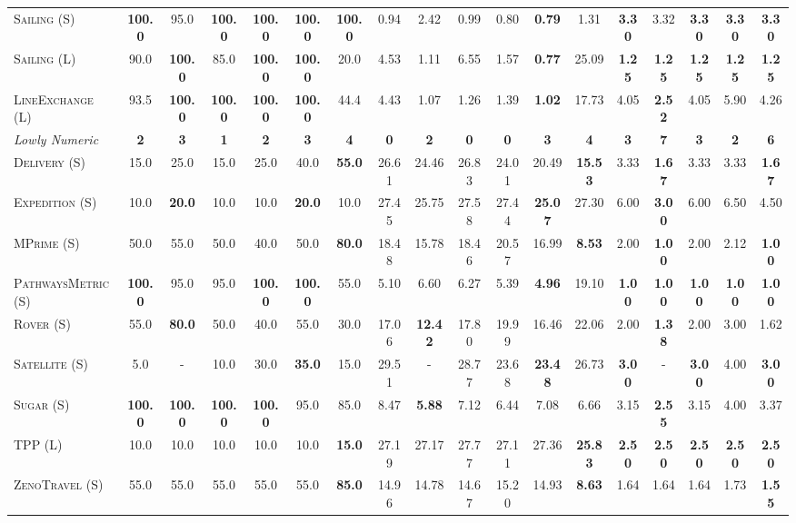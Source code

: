 \documentclass[11pt,landscape]{article}
\begin{document}
\begin{table*}[tb]
{\begin{tabular}{|l||cccccc||cccccc||ccccc||}
\textsc{Sailing} (S)&\textbf{100.0}&95.0&\textbf{100.0}&\textbf{100.0}&\textbf{100.0}&\textbf{100.0}&0.94&2.42&0.99&0.80&\textbf{0.79}&1.31&\textbf{3.30}&3.32&\textbf{3.30}&\textbf{3.30}&\textbf{3.30}\\
\textsc{Sailing} (L)&90.0&\textbf{100.0}&85.0&\textbf{100.0}&\textbf{100.0}&20.0&4.53&1.11&6.55&1.57&\textbf{0.77}&25.09&\textbf{1.25}&\textbf{1.25}&\textbf{1.25}&\textbf{1.25}&\textbf{1.25}\\
\textsc{LineExchange} (L)&93.5&\textbf{100.0}&\textbf{100.0}&\textbf{100.0}&\textbf{100.0}&44.4&4.43&1.07&1.26&1.39&\textbf{1.02}&17.73&4.05&\textbf{2.52}&4.05&5.90&4.26
\\\hline
\textit{Lowly Numeric}&\textbf{2}&\textbf{3}&\textbf{1}&\textbf{2}&\textbf{3}&\textbf{4}&\textbf{0}&\textbf{2}&\textbf{0}&\textbf{0}&\textbf{3}&\textbf{4}&\textbf{3}&\textbf{7}&\textbf{3}&\textbf{2}&\textbf{6}\\\hline
\textsc{Delivery} (S)&15.0&25.0&15.0&25.0&40.0&\textbf{55.0}&26.61&24.46&26.83&24.01&20.49&\textbf{15.53}&3.33&\textbf{1.67}&3.33&3.33&\textbf{1.67}\\
\textsc{Expedition} (S)&10.0&\textbf{20.0}&10.0&10.0&\textbf{20.0}&10.0&27.45&25.75&27.58&27.44&\textbf{25.07}&27.30&6.00&\textbf{3.00}&6.00&6.50&4.50\\
\textsc{MPrime} (S)&50.0&55.0&50.0&40.0&50.0&\textbf{80.0}&18.48&15.78&18.46&20.57&16.99&\textbf{8.53}&2.00&\textbf{1.00}&2.00&2.12&\textbf{1.00}\\
\textsc{PathwaysMetric} (S)&\textbf{100.0}&95.0&95.0&\textbf{100.0}&\textbf{100.0}&55.0&5.10&6.60&6.27&5.39&\textbf{4.96}&19.10&\textbf{1.00}&\textbf{1.00}&\textbf{1.00}&\textbf{1.00}&\textbf{1.00}\\
\textsc{Rover} (S)&55.0&\textbf{80.0}&50.0&40.0&55.0&30.0&17.06&\textbf{12.42}&17.80&19.99&16.46&22.06&2.00&\textbf{1.38}&2.00&3.00&1.62\\
\textsc{Satellite} (S)&5.0&-&10.0&30.0&\textbf{35.0}&15.0&29.51&-&28.77&23.68&\textbf{23.48}&26.73&\textbf{3.00}&-&\textbf{3.00}&4.00&\textbf{3.00}\\
\textsc{Sugar} (S)&\textbf{100.0}&\textbf{100.0}&\textbf{100.0}&\textbf{100.0}&95.0&85.0&8.47&\textbf{5.88}&7.12&6.44&7.08&6.66&3.15&\textbf{2.55}&3.15&4.00&3.37\\
\textsc{TPP} (L)&10.0&10.0&10.0&10.0&10.0&\textbf{15.0}&27.19&27.17&27.77&27.11&27.36&\textbf{25.83}&\textbf{2.50}&\textbf{2.50}&\textbf{2.50}&\textbf{2.50}&\textbf{2.50}\\
\textsc{ZenoTravel} (S)&55.0&55.0&55.0&55.0&55.0&\textbf{85.0}&14.96&14.78&14.67&15.20&14.93&\textbf{8.63}&1.64&1.64&1.64&1.73&\textbf{1.55}
\\\hline


\end{tabular}}
\end{table*}
\end{document}
